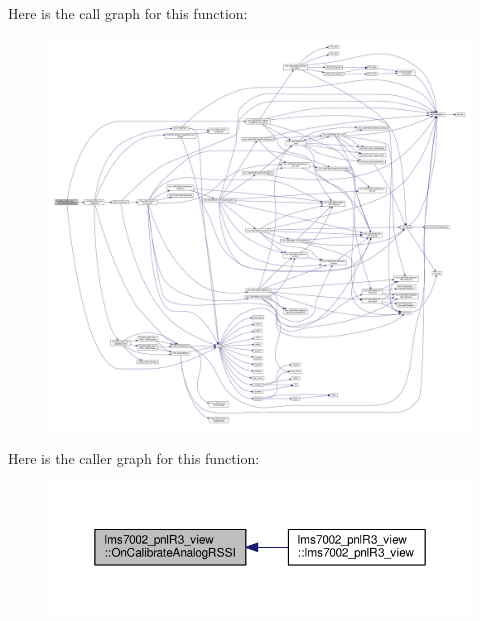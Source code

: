 Here is the call graph for this function\+:
\nopagebreak
\begin{figure}[H]
\begin{center}
\leavevmode
\includegraphics[width=350pt]{d5/d55/classlms7002__pnlR3__view_a44dfc19844a4dccd37b119e782d74ab7_cgraph}
\end{center}
\end{figure}




Here is the caller graph for this function\+:
\nopagebreak
\begin{figure}[H]
\begin{center}
\leavevmode
\includegraphics[width=350pt]{d5/d55/classlms7002__pnlR3__view_a44dfc19844a4dccd37b119e782d74ab7_icgraph}
\end{center}
\end{figure}


